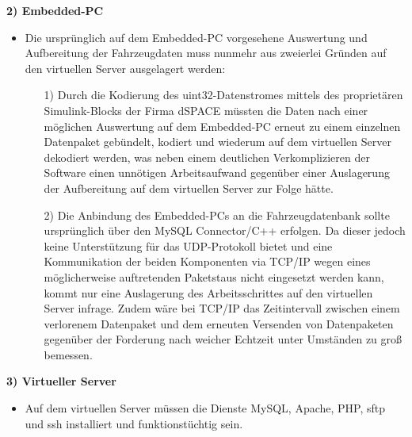 \documentclass[fontsize = 12pt, paper = a4]{scrreprt}
\begin{document}
\textbf{2) Embedded-PC}

\begin{itemize}

\item Die ursprünglich auf dem Embedded-PC vorgesehene Auswertung und Aufbereitung der Fahrzeugdaten muss nunmehr aus zweierlei Gründen auf den virtuellen Server ausgelagert werden: \\

\begin{itemize}

\item[1)] Durch die Kodierung des uint32-Datenstromes mittels des proprietären Simulink-Blocks der Firma dSPACE müssten die Daten nach einer möglichen Auswertung auf dem Embedded-PC erneut zu einem einzelnen Datenpaket gebündelt, kodiert und wiederum auf dem virtuellen Server dekodiert werden, was neben einem deutlichen Verkomplizieren der Software einen unnötigen Arbeitsaufwand gegenüber einer Auslagerung der Aufbereitung auf dem virtuellen Server zur Folge hätte. \\

\item[2)] Die Anbindung des Embedded-PCs an die Fahrzeugdatenbank sollte ursprünglich über den MySQL Connector/C++ erfolgen. Da dieser jedoch keine Unterstützung für das UDP-Protokoll bietet und eine Kommunikation der beiden Komponenten via TCP/IP wegen eines möglicherweise auftretenden Paketstaus nicht eingesetzt werden kann, kommt nur eine Auslagerung des Arbeitsschrittes auf den virtuellen Server infrage. Zudem wäre bei TCP/IP  das Zeitintervall zwischen einem verlorenem Datenpaket und dem erneuten Versenden von Datenpaketen gegenüber der Forderung nach weicher Echtzeit unter Umständen zu groß bemessen. \\

\end{itemize}

\end{itemize}

\newpage

\textbf{3) Virtueller Server}

\begin{itemize}

\item Auf dem virtuellen Server müssen die Dienste MySQL, Apache, PHP, sftp und ssh installiert und funktionstüchtig sein.  

\end{itemize}
\end{document}

